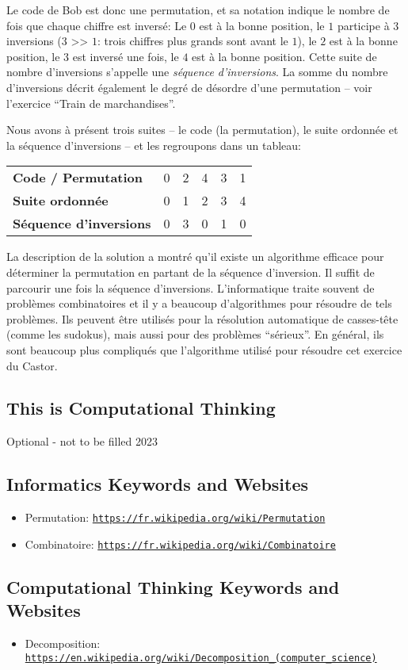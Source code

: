 \documentclass[a4paper,11pt]{report}
\makeatletter
\renewenvironment{adjustwidth}[2]{%
    \begin{list}{}{%
    \partopsep\z@%
    \topsep\z@%
    \listparindent\parindent%
    \parsep\parskip%
    \@ifmtarg{#1}{\setlength{\leftmargin}{\z@}}%
                 {\setlength{\leftmargin}{#1}}%
    \@ifmtarg{#2}{\setlength{\rightmargin}{\z@}}%
                 {\setlength{\rightmargin}{#2}}%
    }
    \item[]}{\end{list}}
\newcommand{\BrochureUrlText}[1]{\texttt{#1}}
\makeatother
\begin{document}
Le code de Bob est donc une permutation, et sa notation indique le nombre de fois que chaque chiffre est inversé: Le $0$ est à la bonne position, le $1$ participe à $3$ inversions ($3$ >\textcompwordmark{}> $1$: trois chiffres plus grands sont avant le $1$), le $2$ est à la bonne position, le $3$ est inversé une fois, le $4$ est à la bonne position. Cette suite de nombre d’inversions s’appelle une \emph{séquence d’inversions}. La somme du nombre d’inversions décrit également le degré de désordre d’une permutation – voir l’exercice “Train de marchandises”.

Nous avons à présent trois suites – le code (la permutation), le suite ordonnée et la séquence d’inversions – et les regroupons dans un tableau:

\begin{adjustwidth}{1.5em}{0em}
\begin{tabular}{ @{} l l l l l l @{} }
  \textbf{Code / Permutation} & 0 & 2 & 4 & 3 & 1 \\ 
  \textbf{Suite ordonnée} & 0 & 1 & 2 & 3 & 4 \\ 
  \textbf{Séquence d’inversions} & 0 & 3 & 0 & 1 & 0
\end{tabular}


\end{adjustwidth}

La description de la solution a montré qu’il existe un algorithme efficace pour déterminer la permutation en partant de la séquence d’inversion. Il suffit de parcourir une fois la séquence d’inversions. L’informatique traite souvent de problèmes combinatoires et il y a beaucoup d’algorithmes pour résoudre de tels problèmes. Ils peuvent être utilisés pour la résolution automatique de casses-tête (comme les sudokus), mais aussi pour des problèmes “sérieux”. En général, ils sont beaucoup plus compliqués que l’algorithme utilisé pour résoudre cet exercice du Castor.


\subsection*{This is Computational Thinking}

Optional - not to be filled 2023


\subsection*{Informatics Keywords and Websites}

\begin{itemize}
  \item Permutation: \href{https://fr.wikipedia.org/wiki/Permutation}{\BrochureUrlText{https://fr.wikipedia.org/wiki/Permutation}}
  \item Combinatoire: \href{https://fr.wikipedia.org/wiki/Combinatoire}{\BrochureUrlText{https://fr.wikipedia.org/wiki/Combinatoire}}
\end{itemize}


\subsection*{Computational Thinking Keywords and Websites}

\begin{itemize}
  \item Decomposition: \href{https://en.wikipedia.org/wiki/Decomposition_(computer_science)}{\BrochureUrlText{https://en.wikipedia.org/wiki/Decomposition\_(computer\_science)}}
\end{itemize}
\end{document}
